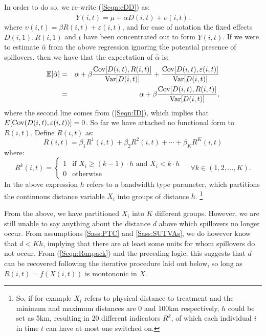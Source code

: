 In order to do so, we re-write (\ref{Seqn:cDD}) as:
\begin{equation}
\label{Seqn:cDDconc}
\tilde{Y}(i,t)=\mu + \alpha D(i,t) + \upsilon(i,t).
\end{equation}
where $\upsilon(i,t)=\beta R(i,t)+\varepsilon(i,t)$, and for ease of notation
the fixed effects $D(i,1), R(i,1)$ and $t$ have been concentrated out to form
$\tilde{Y}(i,t)$.  If we were to estimate $\hat\alpha$ from the above regression
ignoring the potential presence of spillovers, then we have that the expectation 
of $\hat\alpha$ is:
\begin{eqnarray}
\label{Seqn:alphaExp}
\mathbb{E}[\hat\alpha] &=& \alpha + \beta\frac{\mathrm{Cov}[D(i,t),R(i,t)]}{\mathrm{Var}[D(i,t)]}+\frac{\mathrm{Cov}[D(i,t),\varepsilon(i,t)]}{\mathrm{Var}[D(i,t)]} \nonumber \\ 
              &=& \alpha + \beta\frac{\mathrm{Cov}[D(i,t),R(i,t)]}{\mathrm{Var}[D(i,t)]},
\end{eqnarray}
where the second line comes from (\ref{Seqn:ID}), which implies that 
$E[\mathrm{Cov}(D(i,t),\varepsilon(i,t))]=0$.  So far we have attached no functional form 
to $R(i,t)$.  Define $R(i,t)$ as:
\begin{equation}
\label{Seqn:Runpack}
R(i,t) = \beta_1R^1(i,t)+\beta_2R^2(i,t)+ \cdots + \beta_KR^K(i,t)
\end{equation}  
where:
\begin{equation}
\label{Seqn:Rpar}
 R^k(i,t) =
  \begin{cases}
   1   & \text{if\ \ } X_i\geq(k-1)\cdot h \text{\ \ and \ } X_i<k\cdot h \\
   0   & \text{otherwise} 
  \end{cases}\ \ \ \ \ \forall k \in (1,2,\ldots,K).
\end{equation}
In the above expression $h$ refers to a bandwidth type parameter, which 
partitions the continuous distance variable $X_i$ into groups of distance $h$.%
\footnote{So, if for example $X_i$ refers to physical distance to treatment and 
the minimum and maximum distances are 0 and 100km respectively, $h$ could be set 
as 5km, resulting in 20 different indicators $R^k$, of which each individual $i$ 
in time $t$ can have at most one switched on.}

From the above, we have partitioned $X_i$ into $K$ different groups. However, we
are still unable to say anything about the distance $d$ above which spillovers no 
longer occur. From assumptions \ref{Sass:PTC} and \ref{Sass:SUTVAs}, we do 
however know that $d<Kh$, implying that there are at least some units for whom 
spillovers do not occur.  From (\ref{Seqn:Runpack}) and the preceding logic, this 
suggests that $d$ can be recovered following the iterative procedure laid out 
below, so long as $R(i,t)=f(X(i,t))$ is montononic in $X$.

